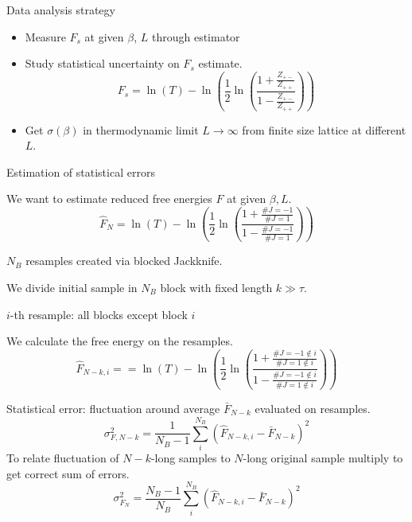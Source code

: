 \documentclass[12pt,handout]{beamer}
\begin{document}
\begin{frame}{Data analysis strategy}
\begin{center}
\begin{itemize}
\item Measure $F_s$ at given $\beta$, $L$ through estimator
\item Study statistical uncertainty on $F_s$ estimate.
\[
	F_s = \ln \left( T \right) - \ln \left( \frac{1}{2} \ln \left( \frac{1 + \frac{Z_{+-}}{Z_{++}}}{1 - \frac{Z_{+-}}{Z_{++}}} \right) \right)
\]
\vspace{10pt}
\item Get $\sigma\left(\beta\right)$ in thermodynamic limit $L\rightarrow \infty$ from finite size lattice at different $L$.
\end{itemize}
\vspace{10pt}
\end{center}
\end{frame}

\begin{frame}{Estimation of statistical errors}
\begin{center}
We want to estimate reduced free energies $F$ at given $\beta, L$.
\[
	\hat{F}_N = \ln \left( T \right) - \ln \left( \frac{1}{2} \ln \left( \frac{1 + \frac{\# J=-1}{\# J=1}}{1 - \frac{\# J =-1}{\# J=1}} \right) \right)
\]

$N_B$ resamples created via blocked Jackknife.

We divide initial sample in $N_B$ block with fixed length $k\gg \tau$.

$i$-th resample: all blocks except block $i$

We calculate the free energy on the resamples.
\[
	\hat{F}_{N-k, i} = = \ln \left( T \right) - \ln \left( \frac{1}{2} \ln \left( \frac{1 + \frac{\# J=-1 \not\in i}{\# J=1 \not\in i}}{1 - \frac{\# J =-1 \not\in i}{\# J=1 \not\in i}} \right) \right)
\]

\end{center}
\end{frame}

\begin{frame}
\begin{center}
Statistical error: fluctuation around average $\bar{F}_{N-k}$ evaluated on resamples.
\[
\sigma_{F, N-k}^2 = \frac{1}{N_B-1}\sum_i ^{N_B} \left(\hat{F}_{N-k, i} - \bar{F}_{N-k}\right)^2
\]
To relate fluctuation of $N-k$-long samples to $N$-long original sample multiply to get correct sum of errors.
\[
\sigma_{F_N}^2 = \frac{N_B-1}{N_B}\sum_i ^{N_B} \left(\hat{F}_{N-k, i} - \bar{F}_{N-k}\right)^2
\]
\end{center}
\end{frame}
\end{document}
